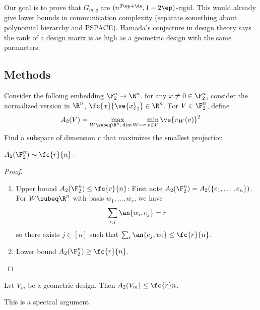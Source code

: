 Our goal is to prove that $G_{m,q}$ are $(n^{2\ep+\de},1-2\ep)$-rigid.
This would already give lower bounds in communication complexity (separate something about polynomial hierarchy and PSPACE). 
Hamada's conjecture in design theory says the rank of a design marix is as high as a geometric design with the same parameters.

\subsection{Methods}

Consider the folloing embedding $\F_2^n\to \R^n$. for any $x\ne 0\in \F_2^n$, consider the normalized version in $\R^n$, $\fc{x}{\ve{x}_2}\in \R^n$. For $V\in \F_2^n$, define
\[
A_2(V)=\max_{W\subeq \R^n,\,\dim W=r} \min_{v\in V} \ve{\pi_W(v)}^2
\]
Find a subspace of dimension $r$ that maximizes the smallest projection.
\begin{lem}
$A_2(\F_2^n)\sim \fc{r}{n}$.
\end{lem}
\begin{proof}
\begin{enumerate}
\item
Upper bound $A_2(\F_2^n)\le \fc{r}{n}$: 
First note $A_2(\F_2^n)=A_2(\{e_1,\ldots, e_n\})$. For $W\subeq \R^n$ with basis $w_1,\ldots, w_r$, we have
\[
\sum_{i,j}\an{w_i,e_j} = r
\]
so there exists $j\in [n]$ such that $\sum_i \an{e_j,w_i}\le \fc{r}{n}$.
\item
Lower bound $A_2(\F_2^n)\ge \fc{r}{n}$.
\end{enumerate}
\end{proof}
\begin{lem}

Let $V_m$ be a geometric design. Then $A_2(V_{m})\le \fc{r}n$.
\end{lem}
This is a spectral argument.

